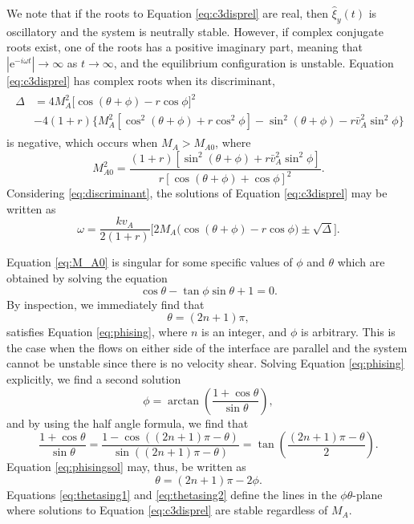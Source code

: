 \documentclass[12pt]{ociamthesis}
\begin{document}
We note that if the roots to Equation \eqref{eq:c3disprel} are real, then $\hat \xi_y (t)$ is oscillatory and the system is neutrally stable.
However, if complex conjugate roots exist, one of the roots has a positive imaginary part, meaning that $|\mathrm{e}^{-i \omega t}| \to \infty$ as $t \to \infty$\/, and the equilibrium configuration is unstable.
Equation \eqref{eq:c3disprel} has complex roots when its discriminant,
%
\begin{align}
\begin{split}
\label{eq:discriminant}
\Delta
& = 4 M_A^2 \big[ \cos(\theta + \phi) - r \cos\phi \big]^2
\\
& - 4 (1 + r) \big\{ M_A^2 [ \cos^2(\theta + \phi) + r \cos^2\phi ]
- \sin^2(\theta + \phi)
- r \bar v_{A}^2 \sin^2\phi
\big\}
\end{split}
\end{align}
%
is negative, which occurs when $M_A > M_{A0}$, where 
%
\begin{equation}
\label{eq:M_A0}
M_{A0}^2 = \frac{(1 + r) [ \sin^2(\theta + \phi) + r \bar v_{A}^2 \sin^2\phi ] }
{r [ \cos(\theta + \phi) + \cos\phi ]^2}.
\end{equation}
%
Considering \eqref{eq:discriminant}, the solutions of Equation \eqref{eq:c3disprel} may be written as
%
\begin{equation}
\label{eq:c3disprelsol}
\omega = \frac{k v_A}{2 (1 + r)}
\bigg[ 2 M_A \big(\cos(\theta + \phi) - r \cos\phi \big) \pm \sqrt{\Delta} \bigg].
\end{equation}
%

Equation \eqref{eq:M_A0} is singular for some specific values of $\phi$ and $\theta$ which are obtained by solving the equation 
\begin{equation}
\label{eq:phising}
\cos\theta - \tan\phi \sin\theta + 1 = 0.
\end{equation}
By inspection, we immediately find that
\begin{equation}
\label{eq:thetasing1}
\theta=(2n+1)\pi,
\end{equation}
satisfies Equation \eqref{eq:phising}, where $n$ is an integer, and $\phi$ is arbitrary.
This is the case when the flows on either side of the interface are parallel and the system cannot be unstable since there is no velocity shear.
Solving Equation \eqref{eq:phising} explicitly, we find a second solution
\begin{equation}
\label{eq:phisingsol}
\phi = \arctan\left( \frac{1 + \cos\theta}{\sin\theta} \right),
\end{equation}
and by using the half angle formula, we find that
\[
\frac{1 + \cos\theta}{\sin\theta} = \frac{1 - \cos\left((2n+1)\pi - \theta\right)}{\sin\left((2n+1)\pi - \theta\right)} = \tan\left(\frac{(2n+1)\pi - \theta}{2} \right).
\]
Equation \eqref{eq:phisingsol} may, thus, be written as
\begin{equation}
\label{eq:thetasing2}
\theta = (2n+1)\pi - 2 \phi.
\end{equation}
Equations \eqref{eq:thetasing1} and \eqref{eq:thetasing2} define the lines in the $\phi\theta$-plane where solutions to Equation \eqref{eq:c3disprel} are stable regardless of $M_A$.
\end{document}
